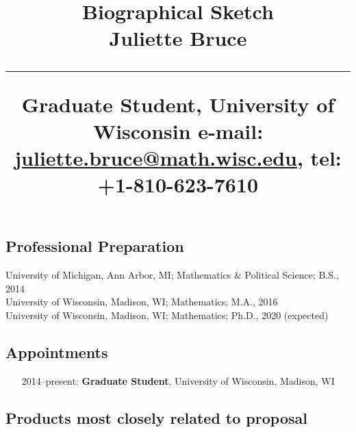 \documentclass[svgnames,11pt]{article}
\title{%
        \vspace{-2\baselineskip}
            \normalsize
            Biographical Sketch\\
            {\large\textbf{Juliette Bruce }}\\
            \vspace{0.5\baselineskip}
            \hrule
            \vspace{0.5\baselineskip}
            Graduate Student, University of Wisconsin
            e-mail: \href{mailto:juliette.bruce@math.wisc.edu}{juliette.bruce@math.wisc.edu},
            tel: +1-810-623-7610
        \vspace{-1.5ex}
        }
\date{}
\author{}
\begin{document}
\maketitle
\vspace{-4\baselineskip}

\subsection{Professional Preparation}

    University of Michigan, Ann Arbor, MI;
        Mathematics \& Political Science;
        B.S., 2014
        \\
    University of Wisconsin, Madison, WI;
        Mathematics;
        M.A., 2016
        \\
     University of Wisconsin, Madison, WI;
        Mathematics;
        Ph.D., 2020 (expected)
 
\subsection{Appointments}

\begin{itemize}[label={--9999:},leftmargin=*,itemsep=0pt]
%
    \item[2014--present:]
        \textbf{Graduate Student},
        University of Wisconsin,
        Madison, WI
%
%
%
%
%
%
\end{itemize}

\subsection{Products most closely related to proposal}
\end{document}
